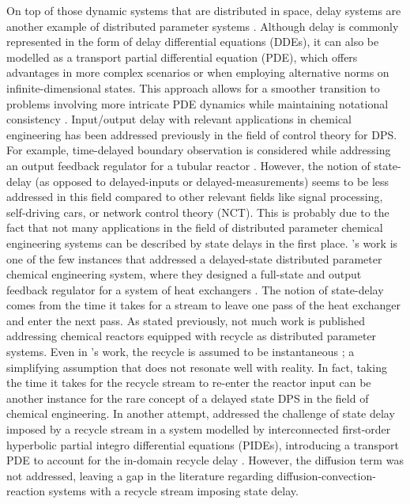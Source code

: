 On top of those dynamic systems that are distributed in space, delay systems are another example of distributed parameter systems \autocite{Curtain2020Introduction}. Although delay is commonly represented in the form of delay differential equations (DDEs), it can also be modelled as a transport partial differential equation (PDE), which offers advantages in more complex scenarios or when employing alternative norms on infinite-dimensional states. This approach allows for a smoother transition to problems involving more intricate PDE dynamics while maintaining notational consistency \autocite{Krstic2009Delay}. Input/output delay with relevant applications in chemical engineering has been addressed previously in the field of control theory for DPS. For example, time-delayed boundary observation is considered while addressing an output feedback regulator for a tubular reactor \autocite{Cassol2019Discrete}. However, the notion of state-delay (as opposed to delayed-inputs or delayed-measurements) seems to be less addressed in this field compared to other relevant fields like signal processing, self-driving cars, or network control theory (NCT). This is probably due to the fact that not many applications in the field of distributed parameter chemical engineering systems can be described by state delays in the first place. 's work is one of the few instances that addressed a delayed-state distributed parameter chemical engineering system, where they designed a full-state and output feedback regulator for a system of heat exchangers \autocite{Cassol2019Heat}. The notion of state-delay comes from the time it takes for a stream to leave one pass of the heat exchanger and enter the next pass. As stated previously, not much work is published addressing chemical reactors equipped with recycle as distributed parameter systems. Even in 's work, the recycle is assumed to be instantaneous \autocite{Khatibi2021Model}; a simplifying assumption that does not resonate well with reality. In fact, taking the time it takes for the recycle stream to re-enter the reactor input can be another instance for the rare concept of a delayed state DPS in the field of chemical engineering. In another attempt,  addressed the challenge of state delay imposed by a recycle stream in a system modelled by interconnected first-order hyperbolic partial integro differential equations (PIDEs), introducing a transport PDE to account for the in-domain recycle delay \autocite{Qi2021Output}. However, the diffusion term was not addressed, leaving a gap in the literature regarding diffusion-convection-reaction systems with a recycle stream imposing state delay.

